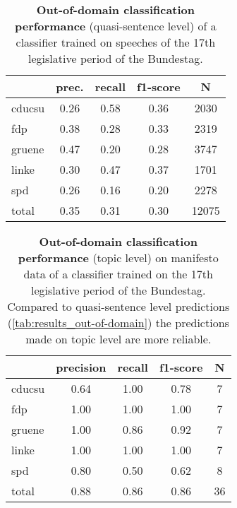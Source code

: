 \documentclass[11pt]{article}
\begin{document}
\begin{table}[t]
\caption{
\label{tab:results_out-of-domain}
{\bf Out-of-domain classification performance} (quasi-sentence level) of a classifier trained on speeches of the 17th legislative period of the Bundestag.
}

\begin{center}
\begin{tabular}{lcccc}
    &         prec.    &recall &  f1-score  & N  \\
\hline \hline
    cducsu    &   0.26   &   0.58   &   0.36    &   2030 \\
    fdp    &   0.38   &   0.28   &   0.33    &   2319 \\
     gruene   &    0.47    &  0.20   &   0.28    &  3747\\
      linke     &  0.30  &    0.47    &  0.37    &   1701\\
        spd     &  0.26  &    0.16   &   0.20    &   2278\\
\hline
total    &   0.35  &    0.31  &    0.30   &   12075\\
%
\end{tabular}
\end{center}

\end{table}

\begin{table}[t]
\caption{
\label{tab:results_topic}
{\bf Out-of-domain classification performance} (topic level) on manifesto data of a classifier trained on the 17th legislative period of the Bundestag. Compared to quasi-sentence level predictions (\autoref{tab:results_out-of-domain}) the predictions made on topic level are more reliable.}
\begin{center}
\begin{tabular}{lcccc}
    &         precision    &recall &  f1-score  & N  \\
    \hline
        \hline
cducsu     &  0.64  &    1.00  &    0.78    &     7\\
       fdp    &   1.00    &  1.00    &  1.00    &     7\\
    gruene  &     1.00  &    0.86  &    0.92    &     7\\
     linke    &   1.00   &   1.00     & 1.00    &     7\\
       spd   &    0.80   &   0.50    &  0.62     &    8\\
    \hline
total  &     0.88   &   0.86   &   0.86  &      36\\
\end{tabular}
\end{center}

\end{table}
\end{document}
